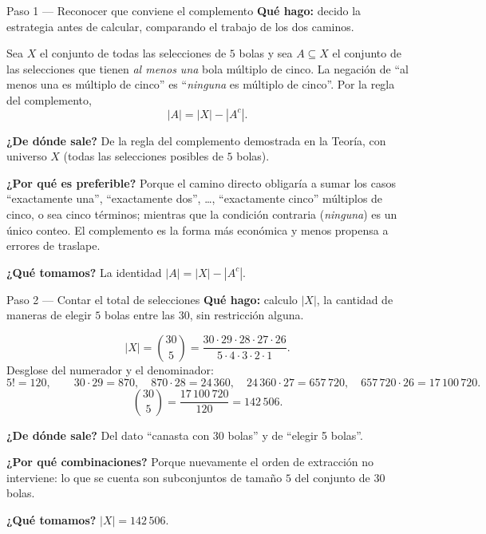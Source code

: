 \documentclass[11pt]{article}
\begin{document}
\begin{paso}{Paso 1 --- Reconocer que conviene el complemento}
\textbf{Qué hago:} decido la estrategia antes de calcular, comparando el trabajo de los dos caminos.

Sea $X$ el conjunto de todas las selecciones de $5$ bolas y sea $A\subseteq X$ el conjunto de las selecciones que tienen \emph{al menos una} bola múltiplo de cinco. La negación de ``al menos una es múltiplo de cinco'' es ``\emph{ninguna} es múltiplo de cinco''. Por la regla del complemento,
\[
|A| = |X| - |A^{c}| .
\]

\textbf{¿De dónde sale?} De la regla del complemento demostrada en la Teoría, con universo $X$ (todas las selecciones posibles de $5$ bolas).

\textbf{¿Por qué es preferible?} Porque el camino directo obligaría a sumar los casos ``exactamente una'', ``exactamente dos'', \ldots, ``exactamente cinco'' múltiplos de cinco, o sea cinco términos; mientras que la condición contraria (\emph{ninguna}) es un único conteo. El complemento es la forma más económica y menos propensa a errores de traslape.

\textbf{¿Qué tomamos?} La identidad $|A| = |X| - |A^c|$.
\end{paso}

\begin{paso}{Paso 2 --- Contar el total de selecciones}
\textbf{Qué hago:} calculo $|X|$, la cantidad de maneras de elegir $5$ bolas entre las $30$, sin restricción alguna.

\[
|X| = \binom{30}{5} = \frac{30\cdot 29\cdot 28\cdot 27\cdot 26}{5\cdot 4\cdot 3\cdot 2\cdot 1} .
\]
Desglose del numerador y el denominador:
\[
5! = 120,\qquad 30\cdot 29 = 870,\quad 870\cdot 28 = 24\,360,\quad 24\,360\cdot 27 = 657\,720,\quad 657\,720\cdot 26 = 17\,100\,720 .
\]
\[
\binom{30}{5} = \frac{17\,100\,720}{120} = 142\,506 .
\]

\textbf{¿De dónde sale?} Del dato ``canasta con 30 bolas'' y de ``elegir 5 bolas''.

\textbf{¿Por qué combinaciones?} Porque nuevamente el orden de extracción no interviene: lo que se cuenta son subconjuntos de tamaño $5$ del conjunto de $30$ bolas.

\textbf{¿Qué tomamos?} $|X| = 142\,506$.
\end{paso}
\end{document}
